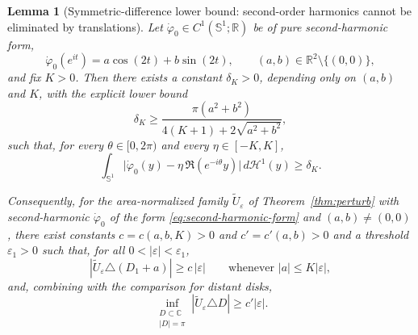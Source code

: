 \documentclass[a4paper,11pt,reqno]{amsart}
\numberwithin{equation}{section}
\theoremstyle{plain} %
\newtheorem{lemma}{Lemma}[section]
\theoremstyle{definition} %
\theoremstyle{remark}
\newcommand{\R}{\mathbb{R}}
\newcommand{\C}{\mathbb{C}}
\begin{document}
\begin{lemma}[Symmetric-difference lower bound: second-order harmonics
cannot be eliminated by translations]\label{lem:symmetric-difference}
Let \(\dot\varphi_0\in C^1(\mathbb S^1;\R)\) be of pure second-harmonic
form,
\begin{equation}\label{eq:second-harmonic-form}
\dot\varphi_0(e^{it})=a\cos(2t)+b\sin(2t),
\qquad (a,b)\in\R^2\setminus\{(0,0)\},
\end{equation}
and fix \(K>0\). Then there exists a constant \(\delta_K>0\), depending only
on \((a,b)\) and \(K\), with the explicit lower bound
\begin{equation}\label{eq:explicit-delta-K-lower}
\delta_K
\ge
\frac{\pi(a^2+b^2)}{4(K+1)+2\sqrt{a^2+b^2}},
\end{equation}
such that, for every \(\theta\in [0,2\pi)\) and every \(\eta\in [-K,K]\),
\begin{equation}\label{eq:l1-uniform-lower}
\int_{\mathbb S^1}\bigl|\dot\varphi_0(y)-\eta\,\Re(e^{-i\theta}y)\bigr|
\,d\mathcal H^1(y)\ge \delta_K.
\end{equation}

Consequently, for the area-normalized family \(\widetilde U_\varepsilon\) of
Theorem~\ref{thm:perturb} with second-harmonic
\(\dot\varphi_0\) of the form \eqref{eq:second-harmonic-form} and
\((a,b)\neq (0,0)\), there exist constants
\(c=c(a,b,K)>0\) and \(c'=c'(a,b)>0\) and a threshold \(\varepsilon_1>0\)
such that, for all \(0<|\varepsilon|<\varepsilon_1\),
\begin{equation}\label{eq:near-disks-explicit}
|\widetilde U_\varepsilon\triangle (D_1+a)|\ge c\,|\varepsilon|
\qquad
\text{whenever }|a|\le K|\varepsilon|,
\end{equation}
and, combining with the comparison for distant disks,
\begin{equation}\label{eq:total-lower}
\inf_{\substack{D\subset\C\\|D|=\pi}}
|\widetilde U_\varepsilon\triangle D|\ge c'|\varepsilon|.
\end{equation}
\end{lemma}
\end{document}
